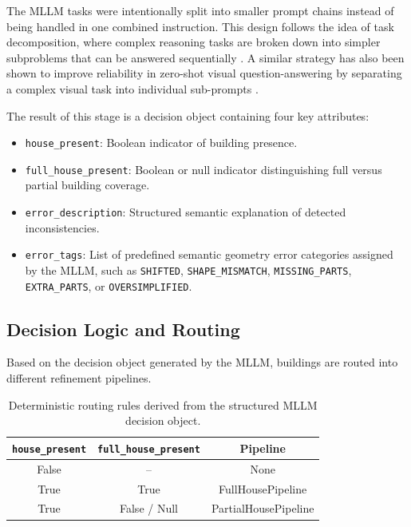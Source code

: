 The MLLM tasks were intentionally split into smaller prompt chains instead of being handled in one combined instruction. This design follows the idea of task decomposition, where complex reasoning tasks are broken down into simpler subproblems that can be answered sequentially \citep{zhou2022least}. A similar strategy has also been shown to improve reliability in zero-shot visual question-answering by separating a complex visual task into individual sub-prompts \citep{Zaid_prompt_decompisiton}.

The result of this stage is a decision object containing four key attributes:

\begin{itemize}
    \item \texttt{house\_present}: Boolean indicator of building presence.
    \item \texttt{full\_house\_present}: Boolean or null indicator distinguishing full versus partial building coverage.
    \item \texttt{error\_description}: Structured semantic explanation of detected inconsistencies.
    \item \texttt{error\_tags}: List of predefined semantic geometry error categories assigned by the MLLM, such as \texttt{SHIFTED}, \texttt{SHAPE\_MISMATCH}, \texttt{MISSING\_PARTS}, \texttt{EXTRA\_PARTS}, or \texttt{OVERSIMPLIFIED}.
\end{itemize}

\subsection{Decision Logic and Routing}
\label{sec:decision_logic_routing}

Based on the decision object generated by the MLLM, buildings are routed into different refinement pipelines.

\begin{table}[htb]
\centering
\caption{Deterministic routing rules derived from the structured MLLM decision object.}
\label{tab:routing_rules}
\begin{tabular}{ccc}
\toprule
\texttt{house\_present} & \texttt{full\_house\_present} & \textbf{Pipeline} \\
\midrule
False & -- & None \\
True & True & FullHousePipeline \\
True & False / Null & PartialHousePipeline \\
\bottomrule
\end{tabular}
\end{table}

